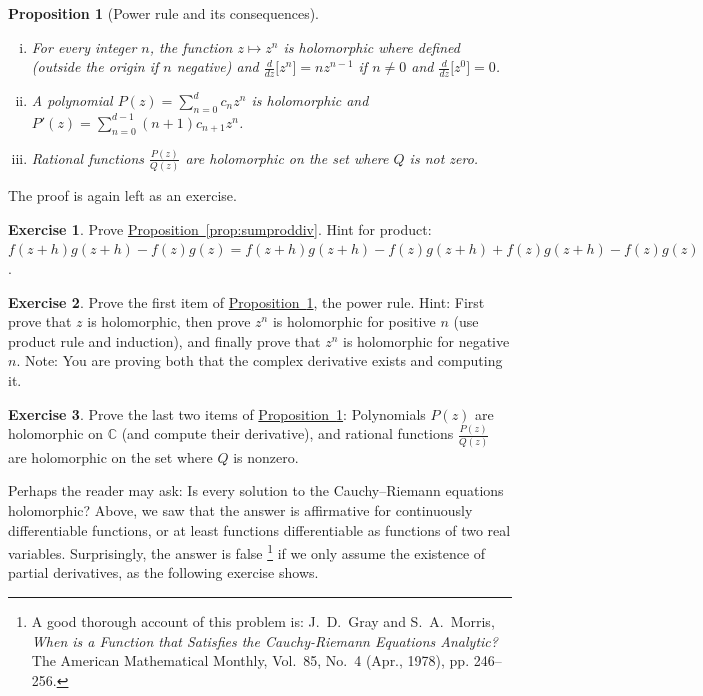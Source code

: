 \documentclass[12pt,openany]{book}
\newcommand{\C}{{\mathbb{C}}}
\theoremstyle{plain}
\newtheorem{prop}[thm]{Proposition}
\theoremstyle{remark}
\theoremstyle{definition}
\newenvironment{exbox}{%
    \def\FrameCommand{\vrule width 1pt \relax\hspace{10pt}}%
    \MakeFramed{\advance\hsize-\width\FrameRestore}%
}{%
    \endMakeFramed
}
\theoremstyle{exercise}
\newtheorem{exercise}{Exercise}[section]
\theoremstyle{example}
\newcommand{\propref}[1]{\hyperref[#1]{Proposition~\ref*{#1}}}
\begin{document}
\begin{prop}[Power rule and its consequences] \label{prop:powerrule}
\leavevmode
\begin{enumerate}[(i)]
\item For every integer $n$, the function $z \mapsto z^n$ is holomorphic
where defined (outside the origin if $n$ negative) and
$\frac{d}{dz}\bigl[ z^n \bigr] = n z^{n-1}$
if $n\not=0$ and $\frac{d}{dz}\bigl[ z^0 \bigr] = 0$.
\item
A polynomial $P(z) = \sum_{n=0}^d c_n z^n$ is
holomorphic and
$P'(z) = \sum_{n=0}^{d-1} (n+1) c_{n+1} z^n$.
\item Rational functions $\frac{P(z)}{Q(z)}$
are holomorphic on the set where $Q$ is not zero.
\end{enumerate}
\end{prop}

The proof is again left as an exercise.

\begin{exbox}
\begin{exercise}
Prove \propref{prop:sumproddiv}.
Hint for product: 
$f(z+h)g(z+h) - f(z)g(z) =
f(z+h)g(z+h) - f(z)g(z+h) +
f(z)g(z+h) - f(z)g(z)$.
\end{exercise}

\begin{exercise}
Prove the first item of \propref{prop:powerrule}, the power rule.
Hint: First prove that $z$ is holomorphic,
then prove $z^n$ is holomorphic for positive $n$ (use product rule and
induction), and finally prove
that $z^n$ is holomorphic for negative $n$.
Note: You are proving both that the complex derivative exists and
computing it.
\end{exercise}

\begin{exercise}
Prove the last two items of \propref{prop:powerrule}:
Polynomials $P(z)$ are holomorphic on $\C$ (and compute their derivative),
and rational functions
$\frac{P(z)}{Q(z)}$ are holomorphic on the set where $Q$ is nonzero.
\end{exercise}
\end{exbox}

Perhaps the reader may ask:
Is every solution to
the Cauchy--Riemann equations holomorphic?  Above, we saw that the answer
is affirmative for continuously differentiable functions, or at least
functions differentiable as functions of two real variables.
Surprisingly, the answer is false%
\footnote{%
A good thorough account of this problem is:
J.\ D.\ Gray and  S.\ A.\ Morris,
\emph{When is a Function that Satisfies the Cauchy-Riemann Equations
Analytic?}  The American Mathematical Monthly, Vol.\ 85, No.\ 4 (Apr.,
1978), pp. 246--256.} if we only assume the existence of partial derivatives,
as the following exercise shows.
\end{document}
